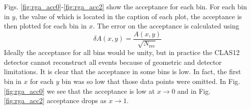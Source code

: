 Figs. \ref{fig:rga_acc0}-\ref{fig:rga_acc2} show the acceptance for each bin. For each bin in $y$, the value of which is located in the caption of each plot, the acceptance is then plotted for each bin in $x$. The error on the acceptance is calculated using
\begin{equation}
\delta A(x,y) = \frac{A(x,y)}{\sqrt{N_{\mathrm{rec}}}}
\end{equation}
Ideally the acceptance for all bins would be unity, but in practice the CLAS12 detector cannot reconstruct all events because of geometric and detector limitations. It is clear that the acceptance in some bins is low. In fact, the first bin in $x$ for each $y$ bin was so low that those data points were omitted. In Fig. \ref{fig:rga_acc0} we see that the acceptance is low at $x \rightarrow 0$ and in Fig. \ref{fig:rga_acc2} acceptance drops as $x \rightarrow 1$.

